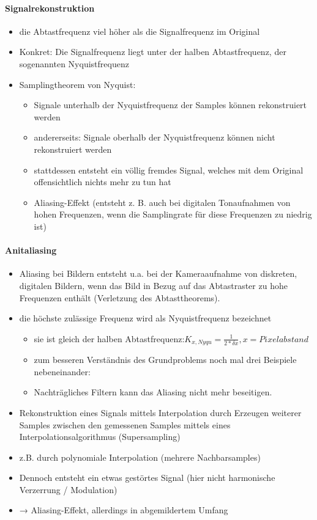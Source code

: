 \documentclass[10pt,landscape]{article}
\begin{document}
\begin{multicols}{3}
\paragraph{Signalrekonstruktion}
\begin{itemize}
  \item die Abtastfrequenz viel höher als die Signalfrequenz im Original
  \item Konkret: Die Signalfrequenz liegt unter der halben Abtastfrequenz, der sogenannten Nyquistfrequenz
  \item Samplingtheorem von Nyquist:
        \begin{itemize}
          \item Signale unterhalb der Nyquistfrequenz der Samples können rekonstruiert werden
          \item andererseits: Signale oberhalb der Nyquistfrequenz können nicht rekonstruiert werden
          \item stattdessen entsteht ein völlig fremdes Signal, welches mit dem Original offensichtlich nichts mehr zu tun hat
          \item Aliasing-Effekt (entsteht z. B. auch bei digitalen Tonaufnahmen von hohen Frequenzen, wenn die Samplingrate für diese Frequenzen zu niedrig ist)
        \end{itemize}
\end{itemize}

\paragraph{Anitaliasing}
\begin{itemize}
  \item Aliasing bei Bildern entsteht u.a. bei der Kameraaufnahme von diskreten, digitalen Bildern, wenn das Bild in Bezug auf das Abtastraster zu hohe Frequenzen enthält (Verletzung des Abtasttheorems).
  \item die höchste zulässige Frequenz wird als Nyquistfrequenz bezeichnet
        \begin{itemize}
          \item sie ist gleich der halben Abtastfrequenz:$K_{x,Nyqu}=\frac{1}{2*\delta x}, x = Pixelabstand$
          \item zum besseren Verständnis des Grundproblems noch mal drei Beispiele nebeneinander:
          \item Nachträgliches Filtern kann das Aliasing nicht mehr beseitigen.
        \end{itemize}
  \item Rekonstruktion eines Signals mittels Interpolation durch Erzeugen weiterer Samples zwischen den gemessenen Samples mittels eines Interpolationsalgorithmus (Supersampling)
  \item z.B. durch polynomiale Interpolation (mehrere Nachbarsamples)
  \item Dennoch entsteht ein etwas gestörtes Signal (hier nicht harmonische Verzerrung / Modulation)
  \item → Aliasing-Effekt, allerdings in abgemildertem Umfang
\end{itemize}


\end{multicols}
\end{document}
